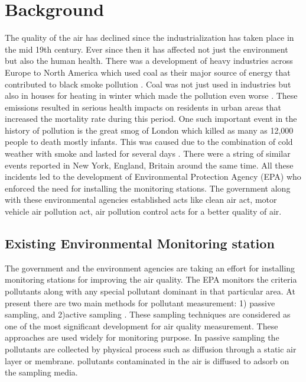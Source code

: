 \section{Background}

The quality of the air has declined since the industrialization has taken place in the mid 19th century. Ever since then it has affected not just the environment but also the human health. There was a development of heavy industries across Europe to North America which used coal as their major source of energy that contributed to black smoke pollution \cite{Heidorn1978} \cite{Timothy}. Coal was not just used in industries but also in houses for heating in winter which made the pollution even worse \cite{Al2016}. These emissions resulted in serious health impacts on residents in urban areas that increased the mortality rate during this period. One such important event in the history of pollution is the great smog of London which killed as many as 12,000 people to death mostly infants. This was caused due to the combination of cold weather with smoke and lasted for several days \cite{londonfog}. There were a string of similar events reported in New York, England, Britain around the same time. All these incidents led to the development of Environmental Protection Agency (EPA) who enforced the need for installing the monitoring stations. The government along with these environmental agencies established acts like clean air act, motor vehicle air pollution act, air pollution control acts for a better quality of air\cite{airpollutionact}. 


\subsection{Existing Environmental Monitoring station}

The government and the environment agencies are taking an effort for installing monitoring stations for improving the air quality. The EPA monitors the criteria pollutants along with any special pollutant dominant in that particular area. At present there are two main methods for pollutant measurement: 1) passive sampling, and 2)active sampling \cite{Balakrishnan2015} \cite{activepassive}. These sampling techniques are considered as one of the most significant development for air quality measurement. These approaches are used widely for monitoring purpose. In passive sampling the pollutants are collected by physical process such as diffusion through a static air layer or membrane. pollutants contaminated in the air is diffused to adsorb on the sampling media.

